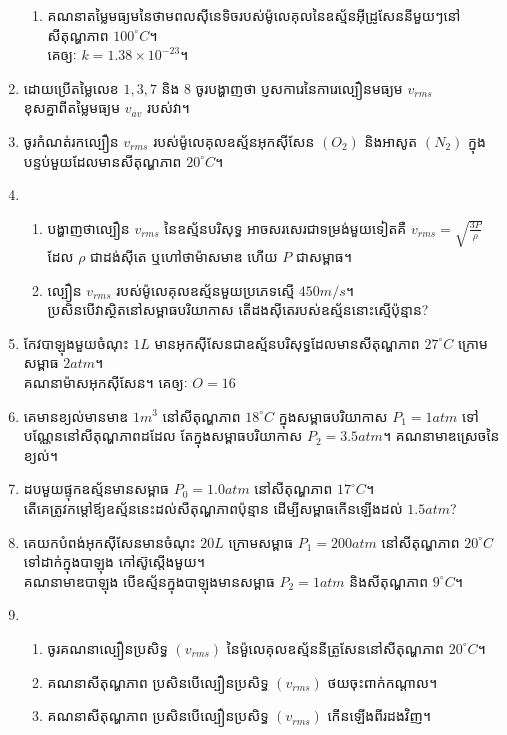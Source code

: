 \begin{enumerate}[m]
\begin{enumerate}[k]
		\item គណនាតម្លៃមធ្យមនៃថាមពលសុីនេទិចរបស់ម៉ូលេគុលនៃឧស្ម័នអុីដ្រូសែននីមួយៗនៅសីតុណ្ហភាព $100^\circ C$។\\ គេឲ្យៈ $k=1.38\times10^{-23}$។
	\end{enumerate}
	\item ដោយប្រើតម្លៃលេខ $1,3,7$ និង $8$ ចូរបង្ហាញថា ប្ញសការេនៃការេល្បឿនមធ្យម $v_{rms}$ \\ខុសគ្នាពីតម្លៃមធ្យម $v_{av}$ របស់វា។
	\item ចូរកំណត់រកល្បឿន $v_{rms}$ របស់ម៉ូលេគុលឧស្ម័នអុកសុីសែន $\left(O_{2}\right)$ និងអាសូត $\left(N_2\right)$ ក្នុងបន្ទប់មួយដែលមានសីតុណ្ហភាព $20^\circ C$។
	\item \begin{enumerate}[k]
		\item បង្ហាញថាល្បឿន $v_{rms}$ នៃឧស្ម័នបរិសុទ្ធ អាចសរសេរជាទម្រង់មួយទៀតគឺ $v_{rms}=\sqrt{\frac{3P}{\rho}}$ ដែល $\rho$ ជាដង់សុីតេ ឬហៅថាម៉ាសមាឌ ហើយ $P$ ជាសម្ពាធ។
		\item ល្បឿន $v_{rms}$ របស់ម៉ូលេគុលឧស្ម័នមួយប្រភេទស្មើ $450m/s$។\\ ប្រសិនបើវាស្ថិតនៅសម្ពាធបរិយាកាស តើដងសុីតេរបស់ឧស្ម័ននោះស្មើប៉ុន្មាន?
	\end{enumerate}
	\item កែវបាឡុងមួយចំណុះ $1L$ មានអុកសុីសែនជាឧស្ម័នបរិសុទ្ធដែលមានសីតុណ្ហភាព $27^\circ C$ ក្រោមសម្ពាធ $2atm$។\\
	គណនាម៉ាសអុកសុីសែន។ គេឲ្យៈ $O=16$
	\item គេមានខ្យល់មានមាឌ $1m^3$ នៅសីតុណ្ហភាព $18^\circ C$ ក្នុងសម្ពាធបរិយាកាស $P_{1}=1atm$ ទៅបណ្ណែននៅសីតុណ្ហភាពដដែល តែក្នុងសម្ពាធបរិយាកាស $P_{2}=3.5atm$។ គណនាមាឌស្រេចនៃខ្យល់។
	\item ដបមួយផ្ទុកឧស្ម័នមានសម្ពាធ $P_{0}=1.0atm$ នៅសីតុណ្ហភាព $17^\circ C$។\\
	តើគេត្រូវកម្តៅឪ្យឧស្ម័ននេះដល់សីតុណ្ហភាពប៉ុន្មាន ដើម្បីសម្ពាធកើនឡើងដល់ $1.5atm$?
	\item គេយកបំពង់អុកសុីសែនមានចំណុះ $20L$ ក្រោមសម្ពាធ $P_{1}=200atm$ នៅសីតុណ្ហភាព $20^\circ C$ ទៅដាក់ក្នុងបាឡុង កៅស៊ូស្តើងមួយ។\\ គណនាមាឌបាឡុង បើឧស្ម័នក្នុងបាឡុងមានសម្ពាធ $P_{2}=1atm$ និងសីតុណ្ហភាព $9^\circ C$។
	\item \begin{enumerate}[k]
		\item ចូរគណនាល្បឿនប្រសិទ្ធ $\left(v_{rms}\right)$ នៃម៉ួលេគុលឧស្ម័ននីត្រូសែននៅសីតុណ្ហភាព $20^\circ C$។
		\item គណនាសីតុណ្ហភាព ប្រសិនបើល្បឿនប្រសិទ្ធ $\left(v_{rms}\right)$ ថយចុះពាក់កណ្តាល។
		\item គណនាសីតុណ្ហភាព ប្រសិនបើល្បឿនប្រសិទ្ធ $\left(v_{rms}\right)$ កើនឡើងពីរដងវិញ។

\end{enumerate}
\end{enumerate}
